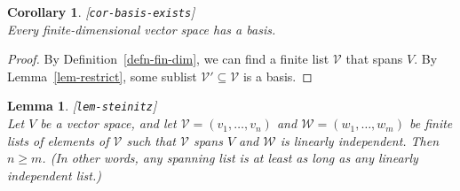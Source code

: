 \documentclass{amsart}
\newcommand{\lbl}[1]{\label{#1}\textup{[\texttt{#1}]}\ \\}
\newcommand{\lbl}{\label}
\newcommand{\sse}       {\subseteq}
\newcommand{\CV}        {{\mathcal{V}}}
\newcommand{\CW}        {{\mathcal{W}}}
\renewcommand{\:}       {\colon}
\newtheorem{lemma}[theorem]{Lemma}
\newtheorem{corollary}[theorem]{Corollary}
\theoremstyle{definition}
\begin{document}
\begin{corollary}\lbl{cor-basis-exists}
 Every finite-dimensional vector space has a basis. 
\end{corollary}
\begin{proof}
 By Definition~\ref{defn-fin-dim}, we can find a finite list
 $\CV$ that spans $V$.  By Lemma~\ref{lem-restrict}, some
 sublist $\CV'\sse\CV$ is a basis.
\end{proof}

\begin{lemma}\lbl{lem-steinitz}
 Let $V$ be a vector space, and let $\CV=(v_1,\dotsc,v_n)$
 and $\CW=(w_1,\dotsc,w_m)$ be finite lists of elements of
 $\CV$ such that $\CV$ spans $V$ and $\CW$ is linearly
 independent.  Then $n\geq m$.  (In other words, any
 spanning list is at least as long as any linearly
 independent list.)
\end{lemma}
\end{document}

